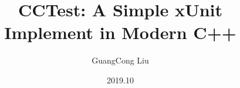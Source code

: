 \title[cctest]
{CCTest: A Simple xUnit Implement in Modern C++}

\subtitle{}

\author[GuangCong Liu]
{ GuangCong Liu
}

\institute[]
{
}

\date[2019-10-10]{2019.10}